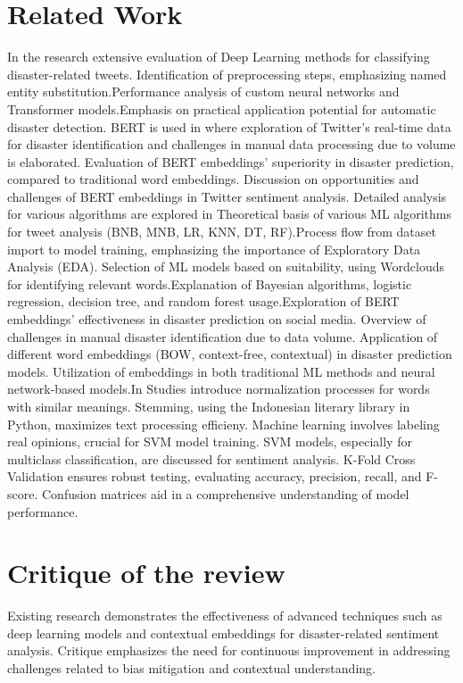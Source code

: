\section{Related Work} 
In the research \cite{chanda2021efficacy} extensive evaluation of Deep Learning methods for classifying disaster-related tweets. Identification of preprocessing steps, emphasizing named entity substitution.Performance analysis of custom neural networks and Transformer models.Emphasis on practical application potential for automatic disaster detection. BERT is used in \cite{deb2022comparative} where exploration of Twitter's real-time data for disaster identification and challenges in manual data processing due to volume is elaborated. Evaluation of BERT embeddings' superiority in disaster prediction, compared to traditional word embeddings. Discussion on opportunities and challenges of BERT embeddings in Twitter sentiment analysis. Detailed analysis for various algorithms are explored in \cite{fontalis2023comparative} Theoretical basis of various ML algorithms for tweet analysis (BNB, MNB, LR, KNN, DT, RF).Process flow from dataset import to model training, emphasizing the importance of Exploratory Data Analysis (EDA).
Selection of ML models based on suitability, using Wordclouds for identifying relevant words.Explanation of Bayesian algorithms, logistic regression, decision tree, and random forest usage.\cite{iparraguirre2023classification}Exploration of BERT embeddings' effectiveness in disaster prediction on social media. Overview of challenges in manual disaster identification due to data volume. Application of different word embeddings (BOW, context-free, contextual) in disaster prediction models.
Utilization of embeddings in both traditional ML methods and neural network-based models.In \cite{saddam2023sentiment}Studies introduce normalization processes for words with similar meanings. Stemming, using the Indonesian literary library in Python, maximizes text processing efficieny. Machine learning involves labeling real opinions, crucial for SVM model training.
SVM models, especially for multiclass classification, are discussed for sentiment analysis. K-Fold Cross Validation ensures robust testing, evaluating accuracy, precision, recall, and F-score. Confusion matrices aid in a comprehensive understanding of model performance.

\section{Critique of the review} %
Existing research demonstrates the effectiveness of advanced techniques such as deep learning models and contextual embeddings for disaster-related sentiment analysis. Critique emphasizes the need for continuous improvement in addressing challenges related to bias mitigation and contextual understanding.


